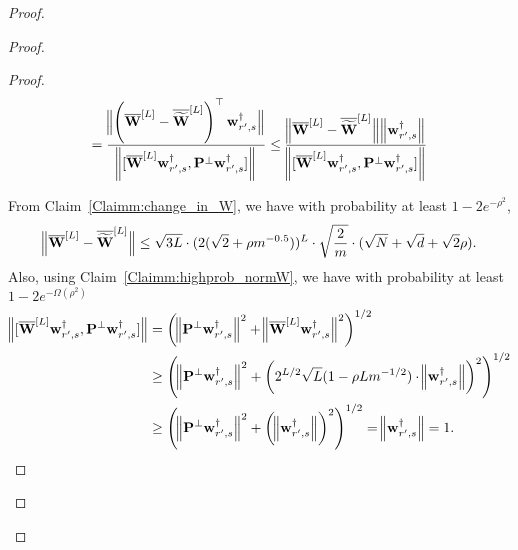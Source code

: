 \begin{claim}
\begin{proof}
\begin{proof}
\begin{proof}
\begin{align}
							= \frac{\norm[2]{\left(\overline{\mathbf{W}}^{[L]} -  \overline{\widetilde{\mathbf{W}}}^{[L]}\right)^{\top} \mathbf{w}_{r', s}^{\dagger} }}
							{\norm{[\overline{\mathbf{W}}^{[L]} \mathbf{w}_{r', s}^{\dagger}, \mathbf{P}^{\perp}\mathbf{w}_{r', s}^{\dagger}]} } 
							\le \frac{\norm[2]{\overline{\mathbf{W}}^{[L]} -  \overline{\widetilde{\mathbf{W}}}^{[L]}} \norm{\mathbf{w}_{r', s}^{\dagger} }}
							{\norm{[\overline{\mathbf{W}}^{[L]} \mathbf{w}_{r', s}^{\dagger}, \mathbf{P}^{\perp}\mathbf{w}_{r', s}^{\dagger}]} } \label{eq:continue_W_Wbar_2}  
						\end{align}
						
						From Claim~\ref{Claimm:change_in_W}, we have with probability at least $1-2e^{-\rho^2}$,
						\begin{align*}
							\norm[2]{\overline{\mathbf{W}}^{[L]} -  \overline{\widetilde{\mathbf{W}}}^{[L]}} \le \sqrt{3L} \cdot (2 (\sqrt{2} + \rho m^{-0.5}))^{L} \cdot \sqrt{\frac{2}{m}} \cdot   (\sqrt{N} + \sqrt{d} + \sqrt{2}\rho).
						\end{align*}
						Also, using Claim~\ref{Claimm:highprob_normW},  we have with probability at least $1-2e^{-\Omega(\rho^2)}$
						\begin{align*}
							\norm[2]{[\overline{\mathbf{W}}^{[L]} \mathbf{w}_{r', s}^{\dagger}, \mathbf{P}^{\perp}\mathbf{w}_{r', s}^{\dagger}]} &= \left(\norm[2]{\mathbf{P}^{\perp}\mathbf{w}_{r', s}^{\dagger}}^2 + \norm[2]{\overline{\mathbf{W}}^{[L]} \mathbf{w}_{r', s}^{\dagger}}^2 \right)^{1/2} \\&
							\ge \left(\norm[2]{\mathbf{P}^{\perp}\mathbf{w}_{r', s}^{\dagger}}^2 + \left(2^{L/2} \sqrt{L} (1 -  \rho L m^{-1/2}) \cdot \norm[2]{\mathbf{w}_{r', s}^{\dagger}}\right)^2 \right)^{1/2} \\&
							\ge \left(\norm[2]{\mathbf{P}^{\perp}\mathbf{w}_{r', s}^{\dagger}}^2 + \left(\norm[2]{\mathbf{w}_{r', s}^{\dagger}}\right)^2 \right)^{1/2} = \norm[2]{\mathbf{w}_{r', s}^{\dagger}} = 1.
						\end{align*}
						

\end{proof}
\end{proof}
\end{proof}
\end{claim}
